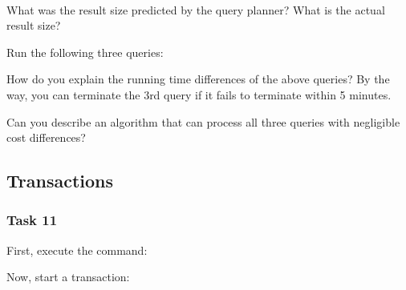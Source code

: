 \vgap

\noindent {} \\

\vgap

\noindent What was the result size predicted by the query planner? What is the actual result size?

\vgap

\noindent Run the following three queries:


\noindent How do you explain the running time differences of the above queries? By the way, you can terminate the 3rd query if it fails to terminate within 5 minutes.

\vgap

\noindent Can you describe an algorithm that can process all three queries with negligible cost differences?


\subsection{Transactions}

\subsubsection{Task 11}

First, execute the command:

\vgap

\noindent
{}

\vgap

\noindent Now, start a transaction: \\

\vgap

\noindent {}


